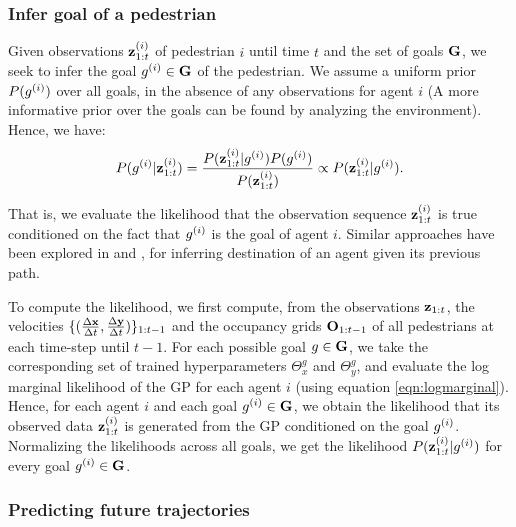\subsubsection{Infer goal of a pedestrian}
\label{sec:infer}

Given observations $\mathbf{z}^{(i)}_{1:t}$ of pedestrian $i$ until time $t$
and the set of goals $\mathbf{G}$, we seek to infer the goal
$g^{(i)} \in \mathbf{G}$ of the pedestrian. We assume a uniform prior
$P(g^{(i)})$ over all goals, in the absence of any observations for
agent $i$ (A more informative prior over the goals can be found by
analyzing the environment). Hence, we have:
\begin{equation}
  \label{eq:1}
  P(g^{(i)}|\mathbf{z}^{(i)}_{1:t}) = \frac{P(\mathbf{z}^{(i)}_{1:t}|g^{(i)}) P(g^{(i)})}{P(\mathbf{z}^{(i)}_{1:t})} \propto P(\mathbf{z}^{(i)}_{1:t}|g^{(i)}).
\end{equation}

That is, we evaluate the likelihood that the observation sequence
$\mathbf{z}^{(i)}_{1:t}$ is true conditioned on the fact that $g^{(i)}$ is
the goal of agent $i$. Similar approaches have been explored in
\cite{kitani12} and \cite{ziebart09}, for inferring destination of an
agent given its previous path.
 
%
%
%
%
%
%
%
%
%
To compute the likelihood, we first compute, from the observations
$\mathbf{z}_{1:t}$, the velocities $\{(\frac{\Delta \mathbf{x}}{\Delta t}, \frac{\Delta \mathbf{y}}{\Delta t})\}_{1:t-1}$ and the
occupancy grids $\mathbf{O}_{1:t-1}$ of all pedestrians at each time-step
until $t-1$.  For each possible goal $g \in \mathbf{G}$, we take the
corresponding set of trained hyperparameters $\Theta_x^g$ and
$\Theta_y^g$, and evaluate the log marginal likelihood of the GP for
each agent $i$ (using equation \ref{eqn:logmarginal}).
%
%
%
%
Hence, for each agent $i$ and each goal $g^{(i)} \in \mathbf{G}$, we obtain
the likelihood that its observed data $\mathbf{z}^{(i)}_{1:t}$ is generated
from the GP conditioned on the goal $g^{(i)}$. Normalizing the
likelihoods across all goals, we get the likelihood
$P(\mathbf{z}_{1:t}^{(i)}|g^{(i)})$ for every goal $g^{(i)} \in \mathbf{G}$.


\subsubsection{Predicting future trajectories}
\label{sec:pred-future-traj}

